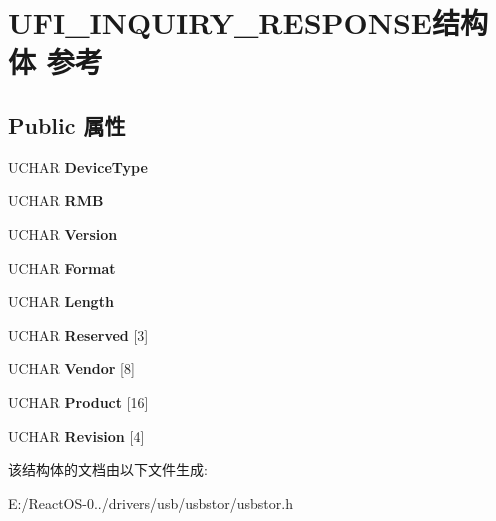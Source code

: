 \hypertarget{struct_u_f_i___i_n_q_u_i_r_y___r_e_s_p_o_n_s_e}{}\section{U\+F\+I\+\_\+\+I\+N\+Q\+U\+I\+R\+Y\+\_\+\+R\+E\+S\+P\+O\+N\+S\+E结构体 参考}
\label{struct_u_f_i___i_n_q_u_i_r_y___r_e_s_p_o_n_s_e}
\subsection*{Public 属性}
\begin{DoxyCompactItemize}
\item 
\mbox{\label{struct_u_f_i___i_n_q_u_i_r_y___r_e_s_p_o_n_s_e_a7a4fd297994a2e466fbec0ddf2b86306}} 
U\+C\+H\+AR {\bfseries Device\+Type}
\item 
\mbox{\label{struct_u_f_i___i_n_q_u_i_r_y___r_e_s_p_o_n_s_e_ad1b6becbd7c25c92f2dbacd29bb431a0}} 
U\+C\+H\+AR {\bfseries R\+MB}
\item 
\mbox{\label{struct_u_f_i___i_n_q_u_i_r_y___r_e_s_p_o_n_s_e_a2c772ebd282026affbf9a27742aca1cb}} 
U\+C\+H\+AR {\bfseries Version}
\item 
\mbox{\label{struct_u_f_i___i_n_q_u_i_r_y___r_e_s_p_o_n_s_e_accec3eac6966f4671f1ab3d809fc91f1}} 
U\+C\+H\+AR {\bfseries Format}
\item 
\mbox{\label{struct_u_f_i___i_n_q_u_i_r_y___r_e_s_p_o_n_s_e_aa2b6c1cb10d37c9547d11af71e024477}} 
U\+C\+H\+AR {\bfseries Length}
\item 
\mbox{\label{struct_u_f_i___i_n_q_u_i_r_y___r_e_s_p_o_n_s_e_a5964323ec60eed9a8f17d0e6e580565a}} 
U\+C\+H\+AR {\bfseries Reserved} \mbox{[}3\mbox{]}
\item 
\mbox{\label{struct_u_f_i___i_n_q_u_i_r_y___r_e_s_p_o_n_s_e_ab0c9fa527f8f70a2a1c79f8ec382116e}} 
U\+C\+H\+AR {\bfseries Vendor} \mbox{[}8\mbox{]}
\item 
\mbox{\label{struct_u_f_i___i_n_q_u_i_r_y___r_e_s_p_o_n_s_e_a451e1f798b324cba402456e8430a76fe}} 
U\+C\+H\+AR {\bfseries Product} \mbox{[}16\mbox{]}
\item 
\mbox{\label{struct_u_f_i___i_n_q_u_i_r_y___r_e_s_p_o_n_s_e_a9654fe05bd1c2e462db86aa1ff8548a2}} 
U\+C\+H\+AR {\bfseries Revision} \mbox{[}4\mbox{]}
\end{DoxyCompactItemize}


该结构体的文档由以下文件生成\+:\begin{DoxyCompactItemize}
\item 
E\+:/\+React\+O\+S-\/0../drivers/usb/usbstor/usbstor.\+h\end{DoxyCompactItemize}
